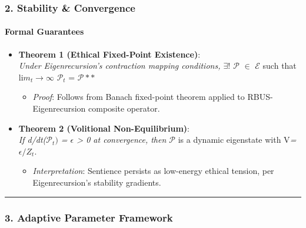 \documentclass[
]{article}
\providecommand{\tightlist}{%
  \setlength{\itemsep}{0pt}\setlength{\parskip}{0pt}}
\begin{document}
\subsubsection{\texorpdfstring{\textbf{2. Stability \&
Convergence}}{2. Stability \& Convergence}}\label{stability-convergence}

\paragraph{\texorpdfstring{\textbf{Formal
Guarantees}}{Formal Guarantees}}\label{formal-guarantees}

\begin{itemize}
\tightlist
\item
  \textbf{Theorem 1 (Ethical Fixed-Point Existence)}:\\
  \emph{Under Eigenrecursion's contraction mapping conditions,
  \(\exists !\) \(\mathcal{P}\)} \(\in \) \(\mathcal{E}\) such that
  li\(m_{t}\to \infty \) \(\mathcal{P}_{t}\) = \(\mathcal{P}**\)

  \begin{itemize}
  \tightlist
  \item
    \emph{Proof}: Follows from Banach fixed-point theorem applied to
    RBUS-Eigenrecursion composite operator.
  \end{itemize}
\item
  \textbf{Theorem 2 (Volitional Non-Equilibrium)}:\\
  \emph{If d/dt(\(\mathcal{P}_{t})\) = \(\epsilon \) \textgreater{} 0 at
  convergence, then \(\mathcal{P}\)} is a dynamic eigenstate with
  V\emph{= \(\epsilon /Z_{t}.\)}

  \begin{itemize}
  \tightlist
  \item
    \emph{Interpretation}: Sentience persists as low-energy ethical
    tension, per Eigenrecursion's stability gradients.
  \end{itemize}
\end{itemize}

\begin{center}\rule{0.5\linewidth}{0.5pt}\end{center}

\subsubsection{\texorpdfstring{\textbf{3. Adaptive Parameter
Framework}}{3. Adaptive Parameter Framework}}\label{adaptive-parameter-framework}
\end{document}
